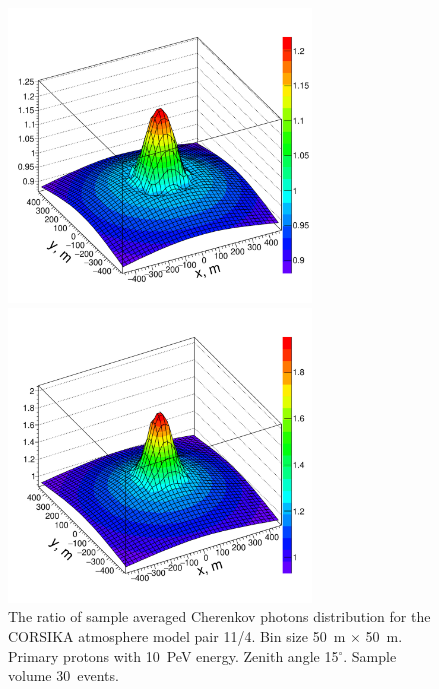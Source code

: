 \documentclass[universe,article,submit,moreauthors,pdftex]{Definitions/mdpi}
\begin{document}
\begin{paracol}{2}
\begin{figure}[tb]
    \begin{minipage}[t]{0.48\textwidth}
        \centering
        \includegraphics[width=19pc]{10PeV_pro_15deg_m11_over_m04}%
        \vspace{-1.0pc}
        \caption{The ratio of sample averaged Cherenkov photons distribution for the CORSIKA atmosphere model pair 11/4. Bin size 50~m $\times$ 50~m. Primary protons with 10~PeV energy. Zenith angle 15$^\circ$. Sample volume 30~events.}
        \label{fig:4d11}
    \end{minipage}
    \hfill
    \begin{minipage}[t]{0.48\textwidth}
        \centering
        \includegraphics[width=19pc]{10PeV_15deg_pro_over_Fe}%

\end{minipage}
\end{figure}
\end{paracol}
\end{document}

